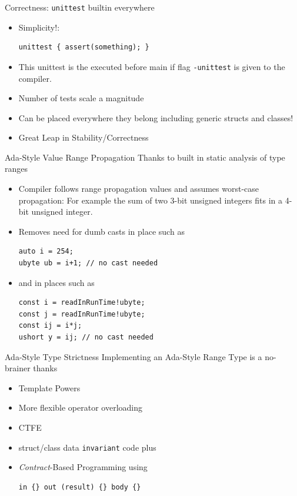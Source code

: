 \documentclass[xcolor=dvipsnames]{beamer}
\begin{document}
\begin{frame}[fragile]{Correctness: \texttt{unittest} builtin everywhere}
  \begin{itemize}[<+->]
  \item Simplicity!:
  \begin{lstlisting}[frame=single]
unittest { assert(something); }
  \end{lstlisting}
  \item This unittest is the executed before main if flag \texttt{-unittest} is
  given to the compiler.
  \item Number of tests scale a magnitude
  \item Can be placed everywhere they belong including generic structs and
    classes!
  \item Great Leap in Stability/Correctness
  \end{itemize}
\end{frame}

\begin{frame}[fragile]{Ada-Style Value Range Propagation}
  Thanks to built in static analysis of type ranges
  \begin{itemize}[<+->]
  \item Compiler follows range propagation values and assumes worst-case
    propagation: For example the sum of two 3-bit unsigned integers fits in a
    4-bit unsigned integer.
  \item Removes need for dumb casts in place such as
    \begin{lstlisting}[frame=single]
auto i = 254;
ubyte ub = i+1; // no cast needed
    \end{lstlisting}
  \item and in places such as
    \begin{lstlisting}[frame=single]
const i = readInRunTime!ubyte;
const j = readInRunTime!ubyte;
const ij = i*j;
ushort y = ij; // no cast needed
    \end{lstlisting}
  \end{itemize}
\end{frame}

\begin{frame}[fragile]{Ada-Style Type Strictness}
  Implementing an Ada-Style Range Type is a no-brainer thanks
  \begin{itemize}[<+->]
  \item Template Powers
  \item More flexible operator overloading
  \item CTFE
  \item struct/class data \texttt{invariant} code {} plus
  \item \emph{Contract}-Based Programming using
    \begin{lstlisting}[frame=single]
in {} out (result) {} body {}
    \end{lstlisting}
  \end{itemize}
\end{frame}
\end{document}
